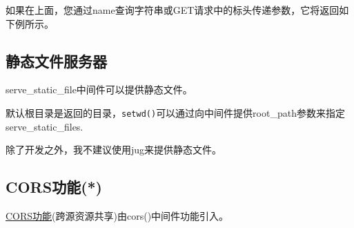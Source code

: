 \documentclass[]{book}
\newenvironment{Shaded}{\begin{snugshade}}{\end{snugshade}}
\newcommand{\KeywordTok}[1]{\textcolor[rgb]{0.13,0.29,0.53}{\textbf{#1}}}
\newcommand{\DecValTok}[1]{\textcolor[rgb]{0.00,0.00,0.81}{#1}}
\newcommand{\FloatTok}[1]{\textcolor[rgb]{0.00,0.00,0.81}{#1}}
\newcommand{\StringTok}[1]{\textcolor[rgb]{0.31,0.60,0.02}{#1}}
\newcommand{\ControlFlowTok}[1]{\textcolor[rgb]{0.13,0.29,0.53}{\textbf{#1}}}
\newcommand{\OperatorTok}[1]{\textcolor[rgb]{0.81,0.36,0.00}{\textbf{#1}}}
\newcommand{\NormalTok}[1]{#1}
\begin{document}
\begin{Shaded}
\end{Shaded}

如果在上面，您通过name查询字符串或GET请求中的标头传递参数，它将返回如下例所示。

\begin{Shaded}
\end{Shaded}

\subsection{静态文件服务器}

serve\_static\_file中间件可以提供静态文件。

\begin{Shaded}
\end{Shaded}

默认根目录是返回的目录，\texttt{setwd()}可以通过向中间件提供root\_path参数来指定serve\_static\_files.

除了开发之外，我不建议使用jug来提供静态文件。

\subsection{CORS功能(*)}\label{cors}

\href{https://developer.mozilla.org/en-US/docs/Web/HTTP/CORS}{CORS功能}(跨源资源共享)由cors()中间件功能引入。
\end{document}

